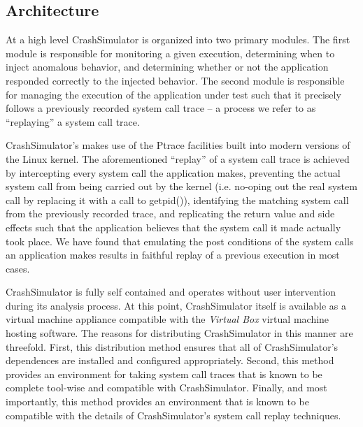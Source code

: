     \subsection{Architecture}
        
    At a high level CrashSimulator is organized into two primary modules. The
    first module is responsible for monitoring a given execution, determining
    when to inject anomalous behavior, and determining whether or not the
    application responded correctly to the injected behavior. The second module
    is responsible for managing the execution of the application under test such
    that it precisely follows a previously recorded system call trace -- a
    process we refer to as ``replaying'' a system call trace.

        
    CrashSimulator's makes use of the Ptrace facilities built into modern
    versions of the Linux kernel. The aforementioned ``replay'' of a system call
    trace is achieved by intercepting every system call the application makes,
    preventing the actual system call from being carried out by the kernel
    (i.e. no-oping out the real system call by replacing it with a call to
    getpid()), identifying the matching system call from the previously recorded
    trace, and replicating the return value and side effects such that the
    application believes that the system call it made actually took place. We
    have found that emulating the post conditions of the system calls an
    application makes results in faithful replay of a previous execution in most
    cases.


    CrashSimulator is fully self contained and operates without user
    intervention during its analysis process. At this point, CrashSimulator
    itself is available as a virtual machine appliance compatible with the
    \emph{Virtual Box} virtual machine hosting software.  The reasons for
    distributing CrashSimulator in this manner are threefold.  First, this
    distribution method ensures that all of CrashSimulator's dependences are
    installed and configured appropriately.  Second, this method provides an
    environment for taking system call traces that is known to be complete
    tool-wise and compatible with CrashSimulator.  Finally, and most importantly,
    this method provides an environment that is known to be compatible with the
    details of CrashSimulator's system call replay techniques.

